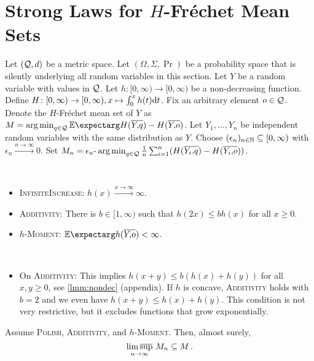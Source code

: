 %
\section{Strong Laws for $H$-Fréchet Mean Sets}\label{sec:nondec}
%
Let $(\mathcal{Q}, d)$ be a metric space. Let $(\Omega, \Sigma, \Pr)$ be a probability space that is silently underlying all random variables in this section. Let $Y$ be a random variable with values in $\mathcal{Q}$.
Let $h \colon [0,\infty) \to [0,\infty)$ be a non-decreasing function.
Define $H \colon [0,\infty) \to [0,\infty), x\mapsto \int_0^x h(t) \mathrm{d} t$.
Fix an arbitrary element $o\in\mathcal{Q}$. Denote the $H$-Fréchet mean set of $Y$ as $M = \argmin_{q\in\mc Q} \Ex{H(\ol Yq) - H(\ol Yo)}$.
Let $Y_1, \dots, Y_n$ be independent random variables with the same distribution as $Y$.
Choose $(\epsilon_n)_{n\in\mathbb{N}}\subseteq [0,\infty)$ with $\epsilon_n \xrightarrow{n\to\infty}0$. Set $M_n = \epsilon_n\text{-}\operatorname*{arg\,min}_{q\in\mathcal{Q}} \frac1n \sum_{i=1}^n (H(\overline{Y_i,\!q}) - H(\overline{Y_i,\!o}))$.
%
\begin{assumptions}\mbox{ }
	\begin{itemize}
	\item \textsc{InfiniteIncrease}:
		$h(x) \xrightarrow{x\to\infty} \infty$.
	\item \textsc{Additivity}:
		There is $b \in [1,\infty)$ such that $h(2x) \leq b h(x)$ for all $x \geq 0$.
	\item \textsc{$h$-Moment}: 
		$\Ex{h(\ol Yo)} < \infty$.
	\end{itemize}
\end{assumptions}
%
\begin{remark}\mbox{ }
\begin{itemize}
\item On \textsc{Additivity}:
	This implies $h(x+y)\leq b(h(x) + h(y))$ for all $x,y\geq 0$, see \autoref{lmm:nondec} (appendix).
	If $h$ is concave, \textsc{Additivity} holds with $b=2$ and we even have $h(x+y)\leq h(x) + h(y)$.
	This condition is not very restrictive, but it excludes functions that grow exponentially.
\end{itemize}
\end{remark}
%
%
\begin{corollary}\label{cor:nondec:epi}
	Assume \textsc{Polish}, \textsc{Additivity}, and \textsc{$h$-Moment}.
	Then, almost surely, 
	\begin{equation*}
		\operatorname*{lim\, \overline{sup}}_{n\to\infty}\, M_n \subseteq M
		\, .
	\end{equation*}
\end{corollary}
%

